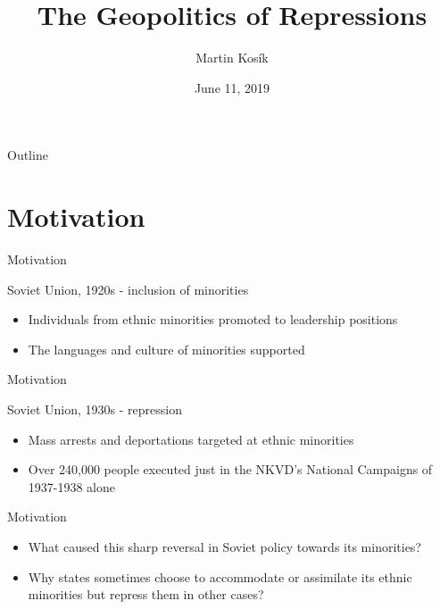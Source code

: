 \documentclass[11pt]{beamer}
\title{The Geopolitics of Repressions}
\date{June 11, 2019}
\author{Martin Kosík}
\institute{Charles University}
\begin{document}
\begin{frame}
\titlepage
\end{frame}
\begin{frame}{Outline}
\tableofcontents
\end{frame}


\section{Motivation}
\begin{frame}{Motivation}
 \begin{block}{Soviet Union, 1920s -  inclusion of minorities}  {
\begin{itemize}
    \item Individuals from ethnic minorities  promoted to leadership positions 
    \item  The languages and culture of minorities supported \citep{martin_affirmative_2001}
\end{itemize}}
\end{block} 
\end{frame}

\begin{frame}{Motivation}
 \begin{block}{Soviet Union, 1930s - repression}  {
\begin{itemize}
    \item Mass arrests and deportations targeted at ethnic minorities
    \item  Over 240,000 people executed just in the NKVD's National Campaigns of 1937-1938 alone \citep[p. 855]{martin_origins_1998}
\end{itemize}}
\end{block} 

\end{frame}

\begin{frame}{Motivation}
\begin{itemize}
    \item What caused this sharp reversal in Soviet policy towards its minorities?
    \item Why states sometimes choose to accommodate or assimilate its ethnic minorities but repress them in other cases?
\end{itemize}

\end{frame}
\end{document}
